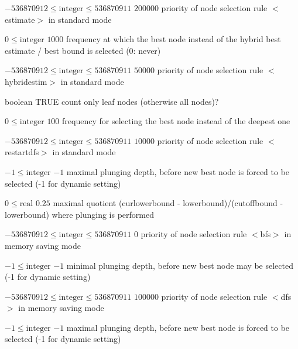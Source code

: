 %
{$-536870912\leq\textrm{integer}\leq536870911$}%
{$200000$}%
{priority of node selection rule $<$estimate$>$ in standard mode}%
{}

%
{$0\leq\textrm{integer}$}%
{$1000$}%
{frequency at which the best node instead of the hybrid best estimate / best bound is selected (0: never)}%
{}

%
{$-536870912\leq\textrm{integer}\leq536870911$}%
{$50000$}%
{priority of node selection rule $<$hybridestim$>$ in standard mode}%
{}

%
{boolean}%
{TRUE}%
{count only leaf nodes (otherwise all nodes)?}%
{}

%
{$0\leq\textrm{integer}$}%
{$100$}%
{frequency for selecting the best node instead of the deepest one}%
{}

%
{$-536870912\leq\textrm{integer}\leq536870911$}%
{$10000$}%
{priority of node selection rule $<$restartdfs$>$ in standard mode}%
{}

%
{$-1\leq\textrm{integer}$}%
{$-1$}%
{maximal plunging depth, before new best node is forced to be selected (-1 for dynamic setting)}%
{}

%
{$0\leq\textrm{real}$}%
{$0.25$}%
{maximal quotient (curlowerbound - lowerbound)/(cutoffbound - lowerbound) where plunging is performed}%
{}

%
{$-536870912\leq\textrm{integer}\leq536870911$}%
{$0$}%
{priority of node selection rule $<$bfs$>$ in memory saving mode}%
{}

%
{$-1\leq\textrm{integer}$}%
{$-1$}%
{minimal plunging depth, before new best node may be selected (-1 for dynamic setting)}%
{}

%
{$-536870912\leq\textrm{integer}\leq536870911$}%
{$100000$}%
{priority of node selection rule $<$dfs$>$ in memory saving mode}%
{}

%
{$-1\leq\textrm{integer}$}%
{$-1$}%
{maximal plunging depth, before new best node is forced to be selected (-1 for dynamic setting)}%
{}

